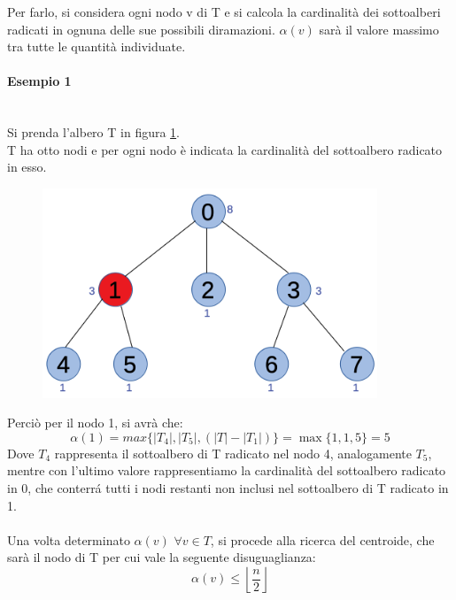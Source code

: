 Per farlo, si considera ogni nodo v di T e si calcola la cardinalit\`a dei sottoalberi radicati in ognuna delle sue possibili diramazioni. 
$\alpha (v)$ sar\`a il valore massimo tra tutte le quantit\`a individuate.
\\

\paragraph{Esempio 1}\mbox{}\\
Si prenda l'albero T in figura \ref{fig:1}.\\ 
T ha otto nodi e per ogni nodo \`e indicata la cardinalit\`a del sottoalbero radicato in esso.
	\begin{figure}[htbp]
	\centering
	\includegraphics[width=10cm]{capitolo3/1}
	\caption{}
	\label{fig:1}
\end{figure}
Perci\`o per il nodo {\color{red} 1}, si avr\`a che:
\begin{equation*}
\alpha(1) = max {\{ |T_4| , |T_5| , (|T| - |T_1| )\}} = \max{\{1, 1, 5\} }  = 5
\end{equation*}
Dove $T_4$ rappresenta il sottoalbero di T radicato nel nodo 4, analogamente $ T_5 $, mentre con l'ultimo valore rappresentiamo la cardinalit\`a del sottoalbero radicato in 0, che conterr\'a tutti i nodi restanti non inclusi nel sottoalbero di T radicato in 1. 
\mbox{}\\\\
Una volta determinato $\alpha(v)$ $\forall v \in T$, si procede alla ricerca del centroide, che sar\`a il nodo di T per cui vale la seguente disuguaglianza:
\begin{equation*}
\alpha(v) \le \left\lfloor\frac{n}{2} \right\rfloor
\end{equation*}
